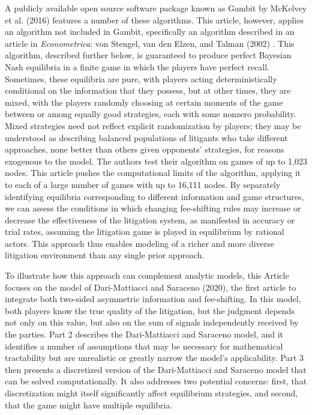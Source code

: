 \documentclass{article}
\begin{document}
A publicly available open source software package known as Gambit by McKelvey et al. (2016) \cite{mckelvey} features a number of these algorithms. This article, however, applies an algorithm not included in Gambit, specifically an algorithm described in an article in \textit{Econometrica}: von Stengel, van den Elzen, and Talman (2002) \cite{vonstengelvandenelzentalman}. This algorithm, described further below, is guaranteed to produce perfect Bayesian Nash equilibria in a finite game in which the players have perfect recall. Sometimes, these equilibria are pure, with players acting deterministically conditional on the information that they possess, but at other times, they are mixed, with the players randomly choosing at certain moments of the game between or among equally good strategies, each with some nonzero probability. Mixed strategies need not reflect explicit randomization by players; they may be understood as describing balanced populations of litigants who take different approaches, none better than others given opponents' strategies, for reasons exogenous to the model. The authors test their algorithm on games of up to 1,023 nodes. This article pushes the computational limits of the algorithm, applying it to each of a large number of games with up to 16,111 nodes. By separately identifying equilibria corresponding to different information and game structures, we can assess the conditions in which changing fee-shifting rules may increase or decrease the effectiveness of the litigation system, as manifested in accuracy or trial rates, assuming the litigation game is played in equilibrium by rational actors. This approach thus enables modeling of a richer and more diverse litigation environment than any single prior approach.

To illustrate how this approach can complement analytic models, this Article focuses on the model of Dari-Mattiacci and Saraceno (2020), the first article to integrate both two-sided asymmetric information and fee-shifting. In this model, both players know the true quality of the litigation, but the judgment depends not only on this value, but also on the sum of signals independently received by the parties. Part 2 describes the Dari-Mattiacci and Saraceno model, and it identifies a number of assumptions that may be necessary for mathematical tractability but are unrealistic or greatly narrow the model's applicability. Part 3 then presents a discretized version of the Dari-Mattiacci and Saraceno model that can be solved computationally. It also addresses two potential concerns: first, that discretization might itself significantly affect equilibrium strategies, and second, that the game might have multiple equilibria.
\end{document}
